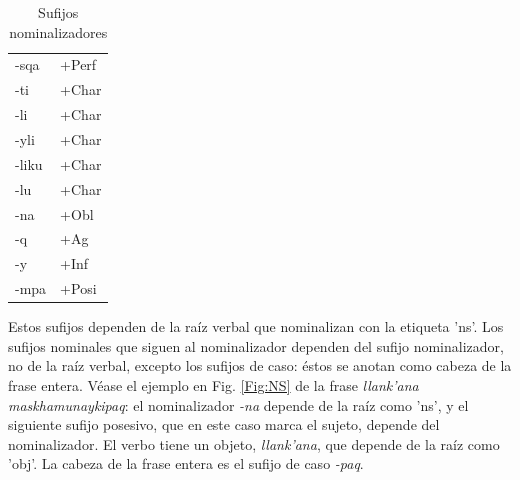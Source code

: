 \documentclass[a4paper,11pt,DIV12]{scrartcl}
\begin{document}
\begin{table}
\caption{Sufijos nominalizadores}\label{Tab:nominalizadores}
 \begin{center}
\begin{tabular}{ll}
\toprule
-sqa & +Perf\\
-ti & +Char\\
-li & +Char\\
-yli & +Char\\
-liku & +Char\\
-lu & +Char\\
-na & +Obl\\
-q & +Ag\\
-y &  +Inf\\
-mpa & +Posi\\
\bottomrule
\end{tabular}
\end{center}
\end{table}



Estos sufijos dependen de la ra\'iz verbal que nominalizan con la etiqueta 'ns'. Los sufijos nominales que siguen al nominalizador dependen del sufijo nominalizador, no de la ra\'iz verbal, excepto los sufijos de caso: \'estos se anotan como cabeza de la frase entera. V\'ease el ejemplo en Fig. \ref{Fig:NS} de la frase \textit{llank'ana maskhamunaykipaq}: el nominalizador \textit{-na} depende de la ra\'iz como 'ns', y el siguiente sufijo posesivo, que en este caso marca el sujeto, depende del nominalizador. El verbo tiene un objeto, \textit{llank'ana}, que depende de la ra\'iz como 'obj'. La cabeza de la frase entera es el sufijo de caso {\em -paq}.
\end{document}
